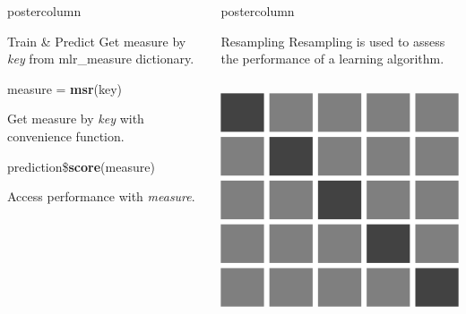 \documentclass{beamer}
\newlength{\columnheight} %
\begin{document}
\begin{frame}[fragile]{}
\begin{columns}
\begin{column}{.245\textwidth}
\begin{beamercolorbox}[center]{postercolumn}
\begin{minipage}{.98\textwidth}
{\begin{myblock}{Train \& Predict}
					Get measure by \textit{key} from mlr\_measure dictionary.
					\\
					\begin{codebox}
						measure = \textbf{msr}(key)
					\end{codebox}
					Get measure by \textit{key} with convenience function.
					\\
					\begin{codebox}
						prediction\$\textbf{score}(measure)
					\end{codebox}
					Access performance with \textit{measure}.
				\end{myblock}
										}
			\end{minipage}
		\end{beamercolorbox}
	\end{column}
		\begin{column}{.245\textwidth}
		  \begin{beamercolorbox}[center]{postercolumn}
			   \begin{minipage}{.98\textwidth}
				  \parbox[t][\columnheight]{\textwidth}{
					  \begin{myblock}{Resampling}
						  Resampling is used to assess the performance of a learning algorithm.
						  \\[\baselineskip]
						    \begin{minipage}{\textwidth}
							    \begin{columns}[T]
								    \begin{column}{0.2\textwidth}\leftskip=14pt
									    \includegraphics[width=\textwidth]{img/cross_validation.png}

\end{column}
\end{columns}
\end{minipage}
\end{myblock}}
\end{minipage}
\end{beamercolorbox}
\end{column}
\end{columns}
\end{frame}
\end{document}
